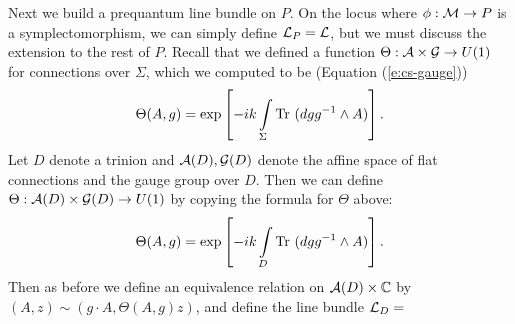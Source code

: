 	Next we build a prequantum line bundle on $P$. On the locus where $\phi:\mathcal{M}\to P$ is a symplectomorphism, we can simply define $\mathcal{L}_P = \mathcal{L}$, but we must discuss the extension to the rest of $P$. Recall that we defined a function $\Theta:\mathcal{A}\times\mathcal{G}\to U(1)$ for connections over $\Sigma$, which we computed to be (Equation (\ref{e:cs-gauge})) 
	\begin{equation}
	\Theta(A,g) = \exp\left[-ik\int\limits_\Sigma \text{Tr }(dg g^{-1}\wedge A)\right].
	\end{equation}
	Let $D$ denote a trinion and $\mathcal{A}(D), \mathcal{G}(D)$ denote the affine space of flat connections and the gauge group over $D$. Then we can define $\Theta:\mathcal{A}(D)\times\mathcal{G}(D)\to U(1)$ by copying the formula for $\Theta$ above:
		\begin{equation}
	\Theta(A,g) = \exp\left[-ik\int\limits_D \text{Tr }(dg g^{-1}\wedge A)\right].
	\end{equation}
	Then as before we define an equivalence relation on $\mathcal{A}(D)\times \mathbb{C}$ by $(A,z)\sim (g\cdot A, \Theta(A,g)z)$, and define the line bundle $\mathcal{L}_{D} = $
	

